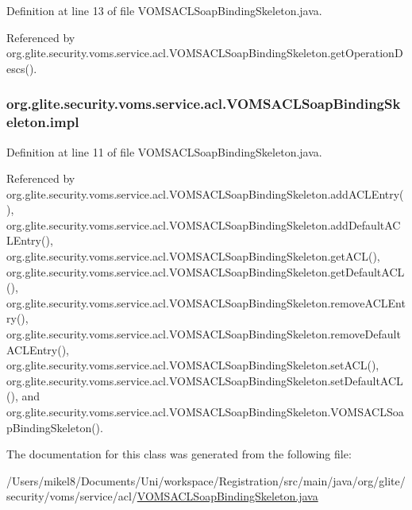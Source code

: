Definition at line 13 of file VOMSACLSoapBindingSkeleton.java.



Referenced by org.glite.security.voms.service.acl.VOMSACLSoapBindingSkeleton.getOperationDescs().

\hypertarget{classorg_1_1glite_1_1security_1_1voms_1_1service_1_1acl_1_1VOMSACLSoapBindingSkeleton_aa21de9ae9ef8035f7cbf563f0d529814}{
\subsubsection[{impl}]{ {\bf org.glite.security.voms.service.acl.VOMSACLSoapBindingSkeleton.impl}}}
\label{classorg_1_1glite_1_1security_1_1voms_1_1service_1_1acl_1_1VOMSACLSoapBindingSkeleton_aa21de9ae9ef8035f7cbf563f0d529814}


Definition at line 11 of file VOMSACLSoapBindingSkeleton.java.



Referenced by org.glite.security.voms.service.acl.VOMSACLSoapBindingSkeleton.addACLEntry(), org.glite.security.voms.service.acl.VOMSACLSoapBindingSkeleton.addDefaultACLEntry(), org.glite.security.voms.service.acl.VOMSACLSoapBindingSkeleton.getACL(), org.glite.security.voms.service.acl.VOMSACLSoapBindingSkeleton.getDefaultACL(), org.glite.security.voms.service.acl.VOMSACLSoapBindingSkeleton.removeACLEntry(), org.glite.security.voms.service.acl.VOMSACLSoapBindingSkeleton.removeDefaultACLEntry(), org.glite.security.voms.service.acl.VOMSACLSoapBindingSkeleton.setACL(), org.glite.security.voms.service.acl.VOMSACLSoapBindingSkeleton.setDefaultACL(), and org.glite.security.voms.service.acl.VOMSACLSoapBindingSkeleton.VOMSACLSoapBindingSkeleton().



The documentation for this class was generated from the following file:\begin{DoxyCompactItemize}
\item 
/Users/mikel8/Documents/Uni/workspace/Registration/src/main/java/org/glite/security/voms/service/acl/\hyperlink{VOMSACLSoapBindingSkeleton_8java}{VOMSACLSoapBindingSkeleton.java}\end{DoxyCompactItemize}
